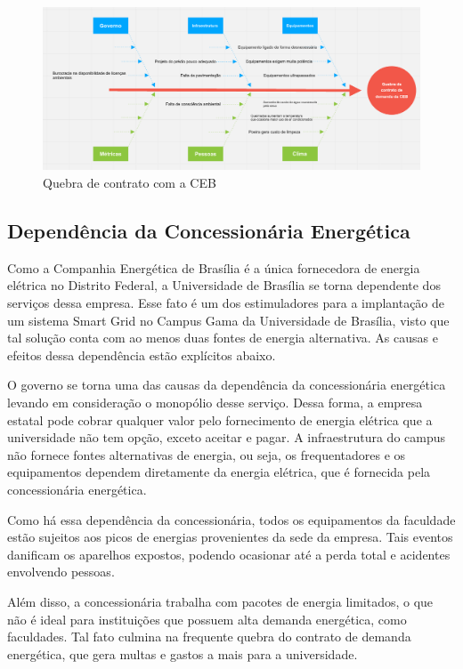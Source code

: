 \begin{figure}[!htb]
\centering
\includegraphics[width=0.75\paperwidth]{figuras/Fishbone1.png}
\caption{Quebra de contrato com a CEB}
\end{figure}

\subsection {Dependência da Concessionária Energética}
Como a Companhia Energética de Brasília é a única fornecedora de energia elétrica no Distrito Federal, a Universidade de Brasília se torna dependente dos serviços dessa empresa. Esse fato é um dos estimuladores para a implantação de um sistema Smart Grid no Campus Gama da Universidade de Brasília, visto que tal solução conta com ao menos duas fontes de energia alternativa. As causas e efeitos dessa dependência estão explícitos abaixo. 
\par O governo se torna uma das causas da dependência da concessionária energética levando em consideração o monopólio desse serviço. Dessa forma, a empresa estatal pode cobrar qualquer valor pelo fornecimento de energia elétrica que a universidade não tem opção, exceto aceitar e pagar. 
A infraestrutura do campus não fornece fontes alternativas de energia, ou seja, os frequentadores e os equipamentos dependem diretamente da energia elétrica, que é fornecida pela concessionária energética.
\par Como há essa dependência da concessionária, todos os equipamentos da faculdade estão sujeitos aos picos de energias provenientes da sede da empresa. Tais eventos danificam os aparelhos expostos, podendo ocasionar até a perda total e acidentes envolvendo pessoas.  
\par Além disso, a concessionária trabalha com pacotes de energia limitados, o que não é ideal para instituições que possuem alta demanda energética, como faculdades. Tal fato culmina na frequente quebra do contrato de demanda energética, que gera multas e gastos a mais para a universidade. 
